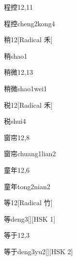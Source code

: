 \begin{entry}{程控}{12,11}
  \begin{phonetics}{程控}{cheng2kong4}
  \end{phonetics}
\end{entry}

\begin{entry}{稍}{12}[Radical 禾]
  \begin{phonetics}{稍}{shao1}
  \end{phonetics}
\end{entry}

\begin{entry}{稍微}{12,13}
  \begin{phonetics}{稍微}{shao1wei1}
  \end{phonetics}
\end{entry}

\begin{entry}{税}{12}[Radical 禾]
  \begin{phonetics}{税}{shui4}
  \end{phonetics}
\end{entry}

\begin{entry}{窗帘}{12,8}
  \begin{phonetics}{窗帘}{chuang1lian2}
  \end{phonetics}
\end{entry}

\begin{entry}{童年}{12,6}
  \begin{phonetics}{童年}{tong2nian2}
  \end{phonetics}
\end{entry}

\begin{entry}{等}{12}[Radical 竹]
  \begin{phonetics}{等}{deng3}[][HSK 1]
  \end{phonetics}
\end{entry}

\begin{entry}{等于}{12,3}
  \begin{phonetics}{等于}{deng3yu2}[][HSK 2]
  \end{phonetics}
\end{entry}

